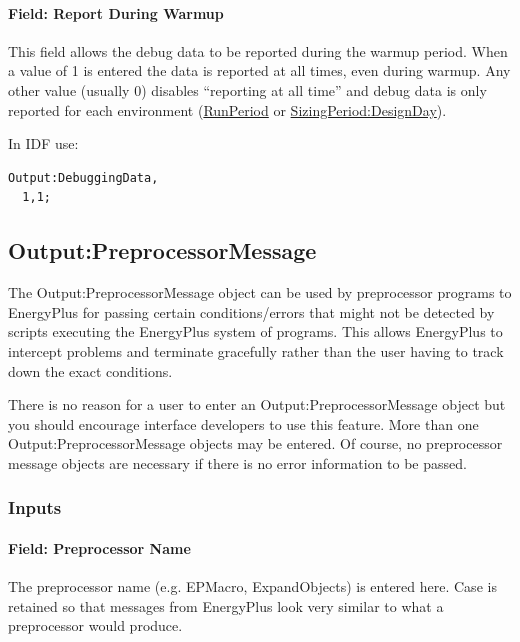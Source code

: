 \paragraph{Field: Report During Warmup}\label{field-report-during-warmup}

This field allows the debug data to be reported during the warmup period. When a value of 1 is entered the data is reported at all times, even during warmup. Any other value (usually 0) disables ``reporting at all time'' and debug data is only reported for each environment (\hyperref[runperiod]{RunPeriod} or \hyperref[sizingperioddesignday]{SizingPeriod:DesignDay}).

In IDF use:

\begin{lstlisting}
Output:DebuggingData,
  1,1;
\end{lstlisting}

\subsection{Output:PreprocessorMessage}\label{outputpreprocessormessage}

The Output:PreprocessorMessage object can be used by preprocessor programs to EnergyPlus for passing certain conditions/errors that might not be detected by scripts executing the EnergyPlus system of programs. This allows EnergyPlus to intercept problems and terminate gracefully rather than the user having to track down the exact conditions.

There is no reason for a user to enter an Output:PreprocessorMessage object but you should encourage interface developers to use this feature. More than one Output:PreprocessorMessage objects may be entered. Of course, no preprocessor message objects are necessary if there is no error information to be passed.

\subsubsection{Inputs}\label{inputs-13-014}

\paragraph{Field: Preprocessor Name}\label{field-preprocessor-name}

The preprocessor name (e.g. EPMacro, ExpandObjects) is entered here. Case is retained so that messages from EnergyPlus look very similar to what a preprocessor would produce.

